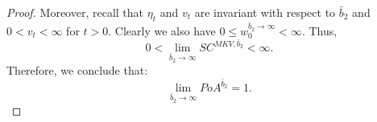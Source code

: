 \documentclass[11pt]{article}
\begin{document}
\begin{proof}

	Moreover, recall that $\eta_t$ and $v_t$ are invariant with respect to $\bar{b}_2$ and $0<v_t<\infty$ for $t>0$. Clearly we also have $0 \leq w^{\bar{b}_2 \to \infty}_0 < \infty$. Thus,
	$$0< \lim_{\bar{b}_2 \to \infty} SC^{MKV,\bar{b}_2} <\infty.$$
	Therefore, we conclude that:
	$$ \lim_{\bar{b}_2 \to \infty} PoA^{\bar{b}_2} = 1.$$
\end{proof}
\end{document}
